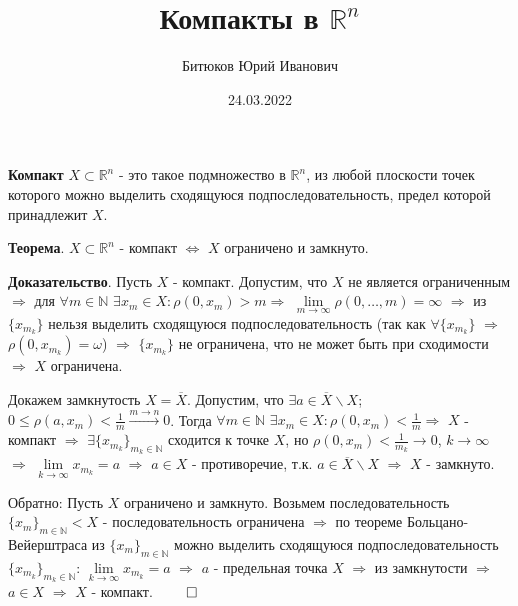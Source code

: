 \documentclass[a4paper,12pt]{article}
\title{Компакты в $\mathbb{R}^n$ }
\author{Битюков Юрий Иванович}
\date{24.03.2022}
\begin{document}
	\maketitle
	\textbf{Компакт} $X \subset \mathbb{R}^n$ - это такое подмножество в $\mathbb{R}^n$, из любой плоскости точек которого можно выделить сходящуюся подпоследовательность, предел которой принадлежит $X$. \\
	\par\textbf{Теорема}. $X \subset \mathbb{R}^n$ - компакт $\Longleftrightarrow$ $X$ ограничено и замкнуто.
	\par\textbf{Доказательство}. Пусть $X$ - компакт. Допустим, что $X$ не является ограниченным $\Longrightarrow$ для $\forall m \in \mathbb{N}$ $\exists x_m \in X: \rho(0, x_m) > m \Longrightarrow $ $\lim\limits_{m\to \infty} \rho(0,\dots,m)=\infty$ $\Longrightarrow$ из $\{x_{m_k}\}$ нельзя выделить сходящуюся подпоследовательность (так как $\forall \{x_{m_k}\}$ $\Longrightarrow$ $\rho(0, x_{m_k}) = \omega$) $\Longrightarrow$ $\{x_{m_k}\}$ не ограничена, что не может быть при сходимости $\Longrightarrow$ $X$ ограничена.
	\par Докажем замкнутость $X = \overline{X}$. Допустим, что $\exists a \in \overline{X} \backslash X $; $0 \le \rho(a, x_m) < \frac{1}{m} \xrightarrow{m \to n} 0$. Тогда $\forall m \in \mathbb{N}$ $\exists x_m \in X: \rho(0,x_m) < \frac{1}{m} \Longrightarrow$ $X$ - компакт $\Longrightarrow$ $\exists \{x_{m_k}\}_{m_k \in \mathbb{N}}$ сходится к точке $X$, но $\rho(0, x_m) < \frac{1}{m_k} \to 0$, $k \to \infty$ $\Longrightarrow $ $\lim\limits_{k\to \infty} x_{m_k}=a$ $\Longrightarrow$ $a \in X$ - противоречие, т.к. $a \in \overline{X} \backslash X$ $\Longrightarrow$ $X$ - замкнуто.
	\par Обратно: Пусть $X$ ограничено и замкнуто. Возьмем последовательность $\{x_m\}_{m \in \mathbb{N}} < X$ - последовательность ограничена $\Longrightarrow$ по теореме Больцано-Вейерштраса из $\{x_m\}_{m \in \mathbb{N}}$ можно выделить сходящуюся подпоследовательность $\{x_{m_k}\}_{m_k \in \mathbb{N}}$: $\lim\limits_{k\to \infty} x_{m_k}=a$ $\Longrightarrow$ $a$ - предельная точка $X$ $\Longrightarrow$ из замкнутости $\Longrightarrow$ $a \in X$ $\Longrightarrow$ $X$ - компакт. $\qed$
\end{document}
